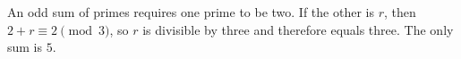 An odd sum of primes requires one prime to be two. If the other is $r$, then $2+r\equiv2\pmod3$, so $r$ is divisible by three and therefore equals three. The only sum is $\boxed5$.
